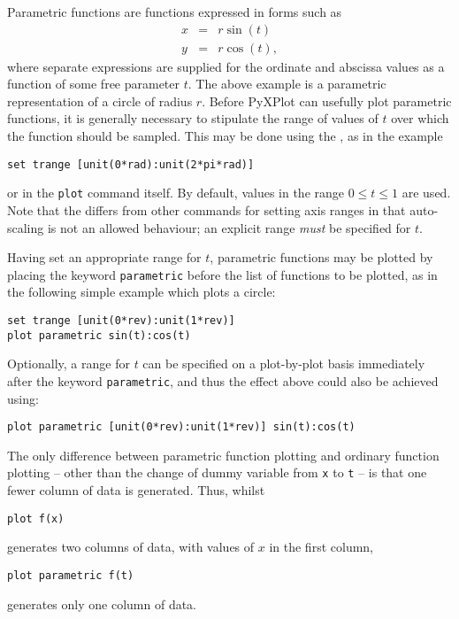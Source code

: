Parametric functions are functions expressed in forms such as
\begin{eqnarray*}
x & = & r \sin(t)  \\
y & = & r \cos(t) ,
\end{eqnarray*}
where separate expressions are supplied for the ordinate and abscissa values as
a function of some free parameter $t$. The above example is a parametric
representation of a circle of radius $r$. Before PyXPlot can usefully plot
parametric functions, it is generally necessary to stipulate the range of
values of $t$ over which the function should be sampled. This may be done using
the , as in the example
\begin{verbatim}
set trange [unit(0*rad):unit(2*pi*rad)]
\end{verbatim}
or in the {\tt plot} command itself. By default, values in the range $0\leq
t\leq1$ are used. Note that the  differs from other
commands for setting axis ranges in that auto-scaling is not an allowed
behaviour; an explicit range {\it must} be specified for $t$.

Having set an appropriate range for $t$, parametric functions may be plotted by
placing the keyword {\tt parametric} before the list of functions to be
plotted, as in the following simple example which plots a circle:
\begin{verbatim}
set trange [unit(0*rev):unit(1*rev)]
plot parametric sin(t):cos(t)
\end{verbatim}
Optionally, a range for $t$ can be specified on a plot-by-plot basis
immediately after the keyword {\tt parametric}, and thus the effect above could
also be achieved using:
\begin{verbatim}
plot parametric [unit(0*rev):unit(1*rev)] sin(t):cos(t)
\end{verbatim}
The only difference between parametric function plotting and ordinary function
plotting -- other than the change of dummy variable from {\tt x} to {\tt t} --
is that one fewer column of data is generated. Thus, whilst
\begin{verbatim}
plot f(x)
\end{verbatim}
generates two columns of data, with values of $x$ in the first column,
\begin{verbatim}
plot parametric f(t)
\end{verbatim}
generates only one column of data.


